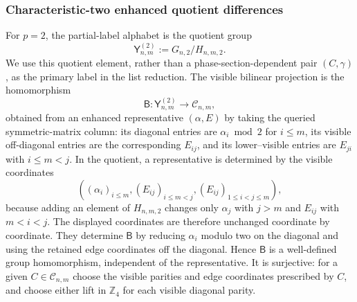 \documentclass[11pt]{article}
\newcommand{\1}{\mathbf 1}
\theoremstyle{plain}
\theoremstyle{definition}
\theoremstyle{remark}
\begin{document}
\subsubsection{Characteristic-two enhanced quotient differences}
For $p=2$, the partial-label alphabet is the quotient group
\begin{equation}
 \mathsf Y_{n,m}^{(2)}:=G_{n,2}/H_{n,m,2}.
 \label{eq:binary-graded-enhanced-label-group}
\end{equation}
We use this quotient element, rather than a phase-section-dependent pair
$(C,\gamma)$, as the primary label in the list reduction.  The visible
bilinear projection is the homomorphism
\begin{equation}
 \mathsf B:\mathsf Y_{n,m}^{(2)}\longrightarrow\mathcal C_{n,m},
 \label{eq:binary-graded-rank-projection}
\end{equation}
obtained from an enhanced representative $(\alpha,E)$ by taking the queried
symmetric-matrix column: its diagonal entries are $\alpha_i\bmod2$ for $i\le m$, its visible off-diagonal entries are the
corresponding $E_{ij}$, and its lower--visible entries are $E_{ji}$ with
$i\le m<j$.  In the quotient, a representative is determined by the visible coordinates
\begin{equation}
 ((\alpha_i)_{i\le m},(E_{ij})_{i\le m<j},
   (E_{ij})_{1\le i<j\le m}),
 \label{eq:binary-graded-visible-enhanced-coordinates}
\end{equation}
because adding an element of $H_{n,m,2}$ changes only $\alpha_j$ with
$j>m$ and $E_{ij}$ with $m<i<j$.  The displayed coordinates are therefore
unchanged coordinate by coordinate.  They determine $\mathsf B$ by reducing
$\alpha_i$ modulo two on the diagonal and using the retained edge
coordinates off the diagonal.  Hence $\mathsf B$ is a well-defined group
homomorphism, independent of the representative.  It is surjective: for a
given $C\in\mathcal C_{n,m}$ choose the visible parities and edge
coordinates prescribed by $C$, and choose either lift in $\mathbb Z_4$ for
each visible diagonal parity.
\end{document}

